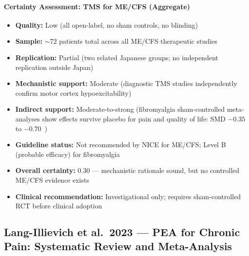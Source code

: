 \paragraph{Certainty Assessment: TMS for ME/CFS (Aggregate)}
\begin{itemize}
    \item \textbf{Quality:} Low (all open-label, no sham controls, no blinding)
    \item \textbf{Sample:} $\sim$72 patients total across all ME/CFS therapeutic studies
    \item \textbf{Replication:} Partial (two related Japanese groups; no independent replication outside Japan)
    \item \textbf{Mechanistic support:} Moderate (diagnostic TMS studies independently confirm motor cortex hypoexcitability)
    \item \textbf{Indirect support:} Moderate-to-strong (fibromyalgia sham-controlled meta-analyses show effects survive placebo for pain and quality of life: SMD $-0.35$ to $-0.70$~\cite{Toh2022fibrorTMS,Su2021fibrorTMS})
    \item \textbf{Guideline status:} Not recommended by NICE for ME/CFS; Level B (probable efficacy) for fibromyalgia~\cite{Lefaucheur2020NIBS}
    \item \textbf{Overall certainty:} 0.30 --- mechanistic rationale sound, but no controlled ME/CFS evidence exists
    \item \textbf{Clinical recommendation:} Investigational only; requires sham-controlled RCT before clinical adoption
\end{itemize}

\subsection{Lang-Illievich et al.\ 2023 --- PEA for Chronic Pain: Systematic Review and Meta-Analysis}

